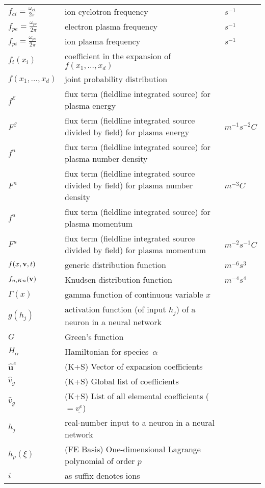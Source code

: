 \begin{longtable}{|p{3.0cm}|p{10.0cm}|p{3.0cm}|}
$f_{ci}= \frac{\omega_{ci}}{2\pi}$ & ion cyclotron frequency & $s^{-1}$ \\
$f_{pe}= \frac{\omega_{pe}}{2\pi}$ & electron plasma frequency & $s^{-1}$ \\
$f_{pi}= \frac{\omega_{pi}}{2\pi}$ & ion plasma frequency & $s^{-1}$ \\
$f_i(x_i)$ & coefficient in the expansion of $f\left(x_1,\ldots,x_d\right)$  & \\
$f\left(x_1,\ldots,x_d\right)$ & joint probability distribution  & \\
$f^\mathcal{E}$ & flux term (fieldline integrated source) for plasma energy  & \\
$F^\mathcal{E}$ & flux term (fieldline integrated source divided by field) for plasma energy  &  $m^{-1} s^{-2} C$ \\
$f^n$ & flux term (fieldline integrated source) for plasma number density & \\
$F^n$ & flux term (fieldline integrated source divided by field) for plasma number density  &  $m^{-3} C$ \\
$f^u$ & flux term (fieldline integrated source) for plasma momentum  & \\
$F^u$ & flux term (fieldline integrated source divided by field) for plasma momentum  &  $m^{-2} s^{-1} C$ \\
$f(x,{\bf v},t)$ & generic distribution function & $m^{-6} s^3$ \\
$f_{n,Kn}({\bf v})$ & Knudsen distribution function & $m^{-4} s^4$ \\
$\Gamma(x)$ & gamma function of continuous variable $x$  & \\
$g(h_j)$ & activation function (of input $h_j$) of a neuron in a neural network  & \\
$G$ & Green's function & \\
$H_\alpha$ & Hamiltonian for species~$\alpha$ & \\
$\hat{\boldsymbol{u}}^e$ &  (K+S) Vector of expansion coefficients & \\
$\hat{v}_g$ &  (K+S) Global list of coefficients & \\
$\hat{v}_g$ &  (K+S) List of all elemental coefficients ($=\underline{v^e}$) & \\
$h_j$ & real-number input to a neuron in a neural network  & \\
$h_p(\xi)$ &  (FE Basis) One-dimensional Lagrange polynomial of order $p$ & \\
$i$ & as suffix denotes ions & \\

\end{longtable}
